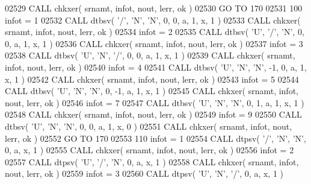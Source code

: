 \begin{DoxyCode}
02529       \textcolor{keyword}{CALL }chkxer( srnamt, infot, nout, lerr, ok )
02530       \textcolor{keywordflow}{GO TO} 170
02531   100 infot = 1
02532       \textcolor{keyword}{CALL }dtbsv( \textcolor{stringliteral}{'/'}, \textcolor{stringliteral}{'N'}, \textcolor{stringliteral}{'N'}, 0, 0, a, 1, x, 1 )
02533       \textcolor{keyword}{CALL }chkxer( srnamt, infot, nout, lerr, ok )
02534       infot = 2
02535       \textcolor{keyword}{CALL }dtbsv( \textcolor{stringliteral}{'U'}, \textcolor{stringliteral}{'/'}, \textcolor{stringliteral}{'N'}, 0, 0, a, 1, x, 1 )
02536       \textcolor{keyword}{CALL }chkxer( srnamt, infot, nout, lerr, ok )
02537       infot = 3
02538       \textcolor{keyword}{CALL }dtbsv( \textcolor{stringliteral}{'U'}, \textcolor{stringliteral}{'N'}, \textcolor{stringliteral}{'/'}, 0, 0, a, 1, x, 1 )
02539       \textcolor{keyword}{CALL }chkxer( srnamt, infot, nout, lerr, ok )
02540       infot = 4
02541       \textcolor{keyword}{CALL }dtbsv( \textcolor{stringliteral}{'U'}, \textcolor{stringliteral}{'N'}, \textcolor{stringliteral}{'N'}, -1, 0, a, 1, x, 1 )
02542       \textcolor{keyword}{CALL }chkxer( srnamt, infot, nout, lerr, ok )
02543       infot = 5
02544       \textcolor{keyword}{CALL }dtbsv( \textcolor{stringliteral}{'U'}, \textcolor{stringliteral}{'N'}, \textcolor{stringliteral}{'N'}, 0, -1, a, 1, x, 1 )
02545       \textcolor{keyword}{CALL }chkxer( srnamt, infot, nout, lerr, ok )
02546       infot = 7
02547       \textcolor{keyword}{CALL }dtbsv( \textcolor{stringliteral}{'U'}, \textcolor{stringliteral}{'N'}, \textcolor{stringliteral}{'N'}, 0, 1, a, 1, x, 1 )
02548       \textcolor{keyword}{CALL }chkxer( srnamt, infot, nout, lerr, ok )
02549       infot = 9
02550       \textcolor{keyword}{CALL }dtbsv( \textcolor{stringliteral}{'U'}, \textcolor{stringliteral}{'N'}, \textcolor{stringliteral}{'N'}, 0, 0, a, 1, x, 0 )
02551       \textcolor{keyword}{CALL }chkxer( srnamt, infot, nout, lerr, ok )
02552       \textcolor{keywordflow}{GO TO} 170
02553   110 infot = 1
02554       \textcolor{keyword}{CALL }dtpsv( \textcolor{stringliteral}{'/'}, \textcolor{stringliteral}{'N'}, \textcolor{stringliteral}{'N'}, 0, a, x, 1 )
02555       \textcolor{keyword}{CALL }chkxer( srnamt, infot, nout, lerr, ok )
02556       infot = 2
02557       \textcolor{keyword}{CALL }dtpsv( \textcolor{stringliteral}{'U'}, \textcolor{stringliteral}{'/'}, \textcolor{stringliteral}{'N'}, 0, a, x, 1 )
02558       \textcolor{keyword}{CALL }chkxer( srnamt, infot, nout, lerr, ok )
02559       infot = 3
02560       \textcolor{keyword}{CALL }dtpsv( \textcolor{stringliteral}{'U'}, \textcolor{stringliteral}{'N'}, \textcolor{stringliteral}{'/'}, 0, a, x, 1 )

\end{DoxyCode}
